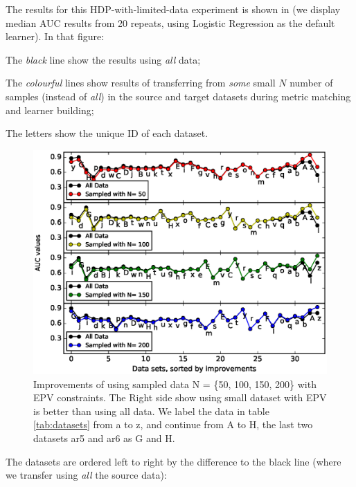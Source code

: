 The results for this HDP-with-limited-data experiment is shown in 
(we display median AUC results from 20 repeats, using  Logistic Regression
as the default learner). 
In that figure:
\squishlist
\item
  The {\em black} line show the results using {\em all} data;
\item
  The {\em colourful} lines show results of transferring from {\em some} small $N$ number of samples (instead of {\em all})
  in the source and target datasets during metric matching and learner building;
\item
  The letters show the unique ID of each dataset.
\squishend
\begin{figure}[t]
	\centering
	\includegraphics[width=0.66\linewidth]{Figures/raleigh/sample_epv.eps}
	\caption{Improvements of using sampled data N  = \{50, 100, 150, 200\} with EPV constraints. The Right side show  using small dataset with EPV is better than using all data. We label the data in table \ref{tab:datasets} from a to z, and continue from A to H, the last two datasets ar5 and ar6 as G and H.}
	\label{fig:small_epv}
\end{figure}
The datasets are ordered left to right by the difference to the black line (where we transfer using {\em
  all} the source data):
